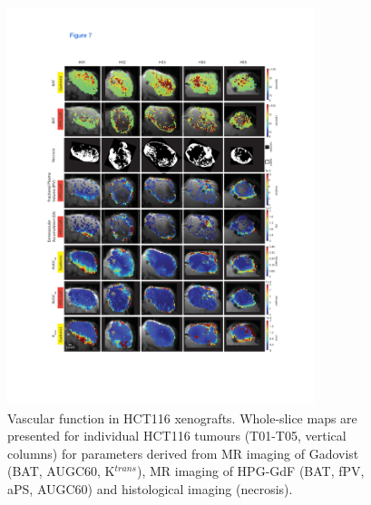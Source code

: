 \begin{figure}[htbp]
 \begin{center}
 \includegraphics[width=0.8\textwidth]{hpg/hpg-paper1-images/hpg_fig7-hct116.pdf}
 \caption{Vascular function in HCT116 xenografts. Whole-slice maps are presented for individual HCT116 tumours (T01-T05, vertical columns) for parameters derived from MR imaging of Gadovist (BAT, AUGC60, K$^{trans}$), MR imaging of \acs{HPG-GdF} (\acs{BAT}, \acs{fPV}, \acs{aPS}, AUGC60) and histological imaging (necrosis).}
 \label{hpgpaper1:fig7}
 \end{center}
\end{figure}

